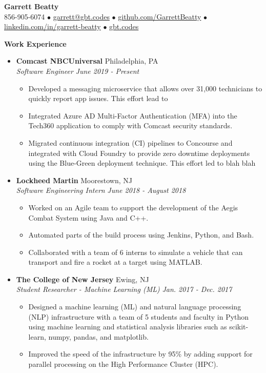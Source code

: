 \documentclass[letterpaper,10pt]{article}
\newcommand{\resitem}[1]{\item #1 \vspace{-2pt}}
\newcommand{\resheading}[1]{{\large \colorbox{mygrey}{\begin{minipage}{\textwidth}{\textbf{#1 \vphantom{p\^{E}}}}\end{minipage}}}}
\newcommand{\ressubheading}[4]{%
  \item\textbf{#1} \hfill #2\null\\
  \textit{#3} \hfill \textit{#4}%
  \vspace{-5pt}
}%
\begin{document}
\begin{center}
\textbf{\Huge Garrett Beatty} \\
\vspace{0.05in}
856-905-6074 $\bullet$ \href{mailto:garrett@gbt.codes}{garrett@gbt.codes} $\bullet$ \href{http://github.com/GarrettBeatty}{github.com/GarrettBeatty} $\bullet$ \href{http://linkedin.com/in/garrett-beatty}{linkedin.com/in/garrett-beatty} $\bullet$ \href{https://gbt.codes}{gbt.codes}
\end{center}

\vspace{-0.05in}

\resheading{Work Experience}
\begin{itemize}

\ressubheading{Comcast NBCUniversal}{Philadelphia, PA}{Software Engineer}{June 2019 - Present}
	\begin{itemize}
		\resitem{Developed a messaging microservice that allows over 31,000 technicians to quickly report app issues. This effort lead to }
		\resitem{Integrated Azure AD Multi-Factor Authentication (MFA) into the Tech360 application to comply with Comcast security standards.}
		\resitem{Migrated continuous integration (CI) pipelines to Concourse and integrated with Cloud Foundry to provide zero downtime deployments using the Blue-Green deployment technique. This effort led to blah blah}

\end{itemize}


\ressubheading{Lockheed Martin}{Moorestown, NJ}{Software Engineering Intern}{June 2018 - August 2018}
	\begin{itemize}
		\resitem{Worked on an Agile team to support the development of the Aegis Combat System using Java and C++.}
		\resitem{Automated parts of the build process using Jenkins, Python, and Bash.}
		\resitem{Collaborated with a team of 6 interns to simulate a vehicle that can transport and fire a rocket at a target using MATLAB.}
	\end{itemize}	

\ressubheading{The College of New Jersey}{Ewing, NJ}{Student Researcher - Machine Learning (ML)}{Jan. 2017 - Dec. 2017}
	\begin{itemize}
		\resitem{Designed a machine learning (ML) and natural language processing (NLP) infrastructure with a team of 5 students and faculty in Python using machine learning and statistical analysis libraries such as scikit-learn, numpy, pandas, and matplotlib.}
		\resitem{Improved the speed of the infrastructure by 95\% by adding support for parallel processing on the High Performance Cluster (HPC).}
		\end{itemize}


\end{itemize}
\end{document}
